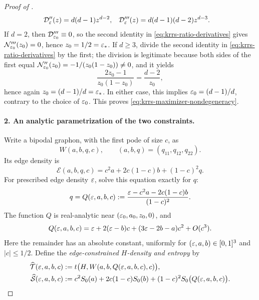 \begin{proof}[Proof of ]
\begin{align*}
  \mathcal D_\varepsilon''(z)&=d(d-1)z^{d-2},
  &
  \mathcal D_\varepsilon'''(z)&=d(d-1)(d-2)z^{d-3}.
\end{align*}
If \(d=2\), then \(\mathcal D_{\varepsilon_0}'''\equiv0\), so the second identity
in \eqref{eq:krrs-ratio-derivatives} gives
\(\mathcal N_{\varepsilon_0}'''(z_0)=0\), hence \(z_0=1/2=\varepsilon_*\).  If
\(d\ge3\), divide the second identity in
\eqref{eq:krrs-ratio-derivatives} by the first; the division is legitimate
because both sides of the first equal
\(\mathcal N_{\varepsilon_0}''(z_0)=-1/(z_0(1-z_0))\ne0\), and it yields
\[
  \frac{2z_0-1}{z_0(1-z_0)}=\frac{d-2}{z_0},
\]
hence again \(z_0=(d-1)/d=\varepsilon_*\).  In either case, this implies $\varepsilon_0 = (d-1)/d$,
contrary to the choice of \(\varepsilon_0\).  This proves
\eqref{eq:krrs-maximizer-nondegeneracy}.

\paragraph{2. An analytic parametrization of the two constraints.}
Write a bipodal graphon, with the first pode of size \(c\), as
\[
  W(a,b,q,c),
  \qquad
  (a,b,q)=(q_{11},q_{12},q_{22}).
\]
Its edge density is
\[
  \mathcal E(a,b,q,c)
  =c^2a+2c(1-c)b+(1-c)^2q.
\]
For prescribed edge density \(\varepsilon\), solve this equation exactly for \(q\):
\begin{equation}\label{eq:krrs-edge-constraint}
  q=Q(\varepsilon,a,b,c)
  :=\frac{\varepsilon-c^2a-2c(1-c)b}{(1-c)^2}.
\end{equation}
The function \(Q\) is real-analytic near
\((\varepsilon_0,a_0,z_0,0)\), and
\begin{equation}\label{eq:krrs-large-block-expansion}
  Q(\varepsilon,a,b,c)
  =\varepsilon+2(\varepsilon-b)c+(3\varepsilon-2b-a)c^2+O(c^3).
\end{equation}
Here the remainder has an absolute constant, uniformly for
$(\varepsilon,a,b)\in[0,1]^3$ and $|c|\le1/2$.
Define the \emph{edge-constrained \(H\)-density and entropy} by
\begin{align*}
  \widehat{\mathcal T}(\varepsilon,a,b,c)
    &:=t\bigl(H,W(a,b,Q(\varepsilon,a,b,c),c)\bigr),\\
  \widehat{\mathcal S}(\varepsilon,a,b,c)
    &:=c^2S_0(a)+2c(1-c)S_0(b)
       +(1-c)^2S_0\bigl(Q(\varepsilon,a,b,c)\bigr).
\end{align*}


\end{proof}

